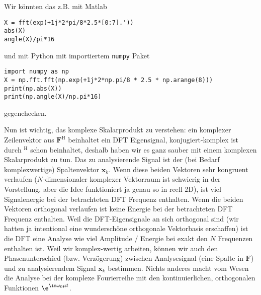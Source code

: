 \begin{ExCalc}

%
Wir könnten das z.B. mit Matlab
\begin{verbatim}
X = fft(exp(+1j*2*pi/8*2.5*[0:7].'))
abs(X)
angle(X)/pi*16
\end{verbatim}
und mit Python mit importiertem \texttt{numpy} Paket
\begin{verbatim}
import numpy as np
X = np.fft.fft(np.exp(+1j*2*np.pi/8 * 2.5 * np.arange(8)))
print(np.abs(X))
print(np.angle(X)/np.pi*16)
\end{verbatim}
gegenchecken.
%

Nun ist wichtig, das komplexe Skalarprodukt zu verstehen: ein komplexer
Zeilenvektor aus $\bm{F}^\mathrm{H}$ beinhaltet ein DFT Eigensignal,
konjugiert-komplex ist durch $^\mathrm{H}$ schon beinhaltet,
deshalb haben wir es ganz sauber mit einem komplexen Skalarprodukt zu tun.
Das zu analysierende Signal ist der (bei Bedarf komplexwertige) Spaltenvektor $\bm{x}_k$.
Wenn diese beiden Vektoren sehr kongruent verlaufen ($N$-dimensionaler
komplexer Vektorraum ist schwierig in der Vorstellung, aber die Idee funktioniert
ja genau so in reell 2D), ist viel Signalenergie
bei der betrachteten DFT Frequenz enthalten. Wenn die beiden Vektoren orthogonal
verlaufen ist keine Energie bei der betrachteten DFT Frequenz enthalten.
%
Weil die DFT-Eigensignale an sich orthogonal sind (wir hatten ja intentional
eine wunderschöne orthogonale
Vektorbasis erschaffen) ist die DFT eine Analyse wie viel Amplitude / Energie
bei exakt den $N$ Frequenzen enthalten ist. Weil wir komplex-wertig arbeiten, können
wir auch den Phasenunterschied (bzw. Verzögerung)
zwischen Analysesignal (eine Spalte in $\bm{F}$)
und zu analysierendem Signal $\bm{x}_k$ bestimmen. Nichts anderes macht vom Wesen
die Analyse bei der komplexe Fourierreihe mit den kontinuierlichen, orthogonalen
Funktionen $\e^{\im\omega_0 \mu t}$.
%


\end{ExCalc}
